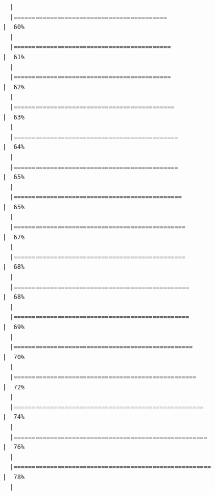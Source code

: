 \documentclass[
  letterpaper,
  DIV=11,
  numbers=noendperiod]{scrreprt}
\begin{document}
\begin{verbatim}
  |                                                                            
  |==========================================                            |  60%
  |                                                                            
  |===========================================                           |  61%
  |                                                                            
  |===========================================                           |  62%
  |                                                                            
  |============================================                          |  63%
  |                                                                            
  |=============================================                         |  64%
  |                                                                            
  |=============================================                         |  65%
  |                                                                            
  |==============================================                        |  65%
  |                                                                            
  |===============================================                       |  67%
  |                                                                            
  |===============================================                       |  68%
  |                                                                            
  |================================================                      |  68%
  |                                                                            
  |================================================                      |  69%
  |                                                                            
  |=================================================                     |  70%
  |                                                                            
  |==================================================                    |  72%
  |                                                                            
  |====================================================                  |  74%
  |                                                                            
  |=====================================================                 |  76%
  |                                                                            
  |======================================================                |  78%
  |                                                                            

\end{verbatim}
\end{document}
